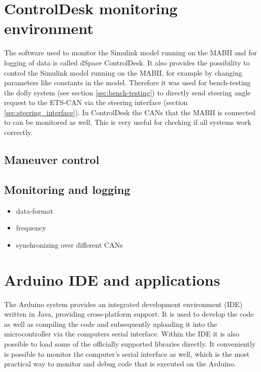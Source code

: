 \documentclass[ExampleMasters.tex]{subfiles}
\begin{document}
\section{ControlDesk monitoring environment}
\label{sec:control_desk}
The software used to monitor the Simulink model running on the MABII and for logging of data is called dSpace ControlDesk. It also provides the possibility to control the Simulink model running on the MABII, for example by changing parameters like constants in the model. Therefore it was used for bench-testing the dolly system (see section \ref{sec:bench-testing}) to directly send steering angle request to the ETS-CAN via the steering interface (section \ref{sec:steering_interface}). In ControlDesk the CANs that the MABII is connected to can be monitored as well. This is very useful for checking if all systems work correctly. 
\subsection{Maneuver control}


\subsection{Monitoring and logging}
\begin{itemize}
	\item data-format
	\item frequency
	\item synchronizing over different CANs	
\end{itemize}


\section{Arduino IDE and applications}
\label{sec:arduino_applications}

The Arduino system provides an integrated development environment (IDE)  written in Java, providing cross-platform support. It is used to develop the code as well as compiling the code and subsequently uploading it into the microcontroller via the computers serial interface. Within the IDE it is also possible to load some of the officially supported libraries directly. It conveniently is possible to monitor the computer's serial interface as well, which is the most practical way to monitor and debug code that is executed on the Arduino. 
\end{document}

